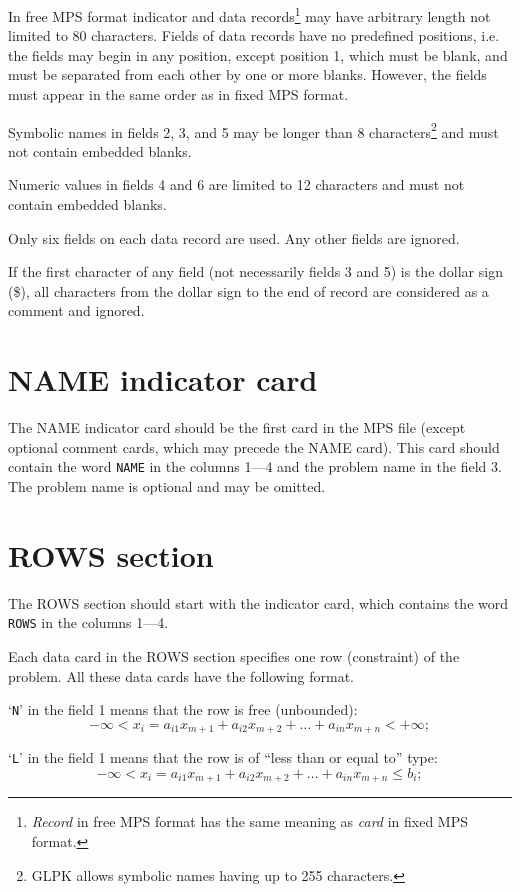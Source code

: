 In free MPS format indicator and data records\footnote{{\it Record} in
free MPS format has the same meaning as {\it card} in fixed MPS format.}
may have arbitrary length not limited to 80 characters. Fields of data
records have no predefined positions, i.e. the fields may begin in any
position, except position 1, which must be blank, and must be separated
from each other by one or more blanks. However, the fields must appear
in the same order as in fixed MPS format.

Symbolic names in fields 2, 3, and 5 may be longer than 8
characters\footnote{GLPK allows symbolic names having up to 255
characters.}
and must not contain embedded blanks.

Numeric values in fields 4 and 6 are limited to 12 characters and must
not contain embedded blanks.

Only six fields on each data record are used. Any other fields are
ignored.

If the first character of any field (not necessarily fields 3 and 5)
is the dollar sign (\$), all characters from the dollar sign to the end
of record are considered as a comment and ignored.

\section{NAME indicator card}

The NAME indicator card should be the first card in the MPS file (except
optional comment cards, which may precede the NAME card). This card
should contain the word \verb|NAME| in the columns 1---4 and the problem
name in the field 3. The problem name is optional and may be omitted.

\section{ROWS section}
\label{secrows}

The ROWS section should start with the indicator card, which contains
the word \verb|ROWS| in the columns 1---4.

Each data card in the ROWS section specifies one row (constraint) of the
problem. All these data cards have the following format.

`\verb|N|' in the field 1 means that the row is free (unbounded):
$$-\infty < x_i = a_{i1}x_{m+1} + a_{i2}x_{m+2} + \dots + a_{in}x_{m+n}
< +\infty;$$

`\verb|L|' in the field 1 means that the row is of ``less than or equal
to'' type:
$$-\infty < x_i = a_{i1}x_{m+1} + a_{i2}x_{m+2} + \dots + a_{in}x_{m+n}
\leq b_i;$$

